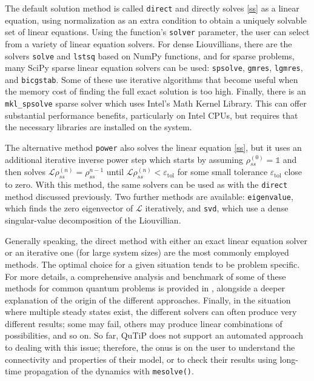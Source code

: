 \documentclass[preprint,3p,sort&compress]{elsarticle}
\def\code#1{\texttt{#1}}
\begin{document}
The default solution method is called \code{direct} and directly solves \eqref{ss} as a linear equation, using normalization as an extra condition %
    to obtain a uniquely solvable set of linear equations.
Using the function's \code{solver} parameter, the user can select from a variety of linear equation solvers. For dense Liouvillians, there are the solvers \code{solve} and \code{lstsq} based on NumPy functions, and for sparse problems, many SciPy sparse linear equation solvers can be used: \code{spsolve}, \code{gmres}, \code{lgmres}, and \code{bicgstab}.  Some of these use iterative algorithms that become useful when the memory cost of finding the full exact solution is too high.  Finally, there is an \code{mkl\_spsolve} sparse solver which uses Intel's Math Kernel Library. This can offer substantial performance benefits, particularly on Intel CPUs, but requires that the necessary libraries are installed on the system.

The alternative method \code{power} also solves the linear equation \eqref{ss}, but it uses an additional iterative inverse power step \cite{nation2015steadystate} which starts by assuming $\rho^{(0)}_{ss} = \mathbb{1}$ and then solves $\mathcal L \rho^{(n)}_{ss} = \rho^{n-1}_{ss}$ until $\mathcal L\rho^{(n)}_{ss} < \varepsilon_{\mathrm{tol}}$ for some small tolerance $\varepsilon_{\mathrm{tol}}$ close to zero. With this method, the same solvers can be used as with the \code{direct} method discussed previously. Two further methods are available: \code{eigenvalue}, which finds the zero eigenvector of $\mathcal{L}$ iteratively, and \code{svd}, which use a dense singular-value decomposition of the Liouvillian.

Generally speaking, the direct method with either an exact linear equation solver or an iterative one (for large system sizes) are the most commonly employed methods. The optimal choice for a given situation tends to be problem specific. For more details, a comprehensive analysis and benchmark of some of these methods for common quantum problems is provided in \cite{nation2015steadystate}, alongside a deeper explanation of the origin of the different approaches.  Finally, in the situation where multiple steady states exist, the different solvers can often produce very different results; some may fail, others may produce linear combinations of possibilities, and so on. So far, QuTiP does not support an automated approach to dealing with this issue; therefore, the onus is on the user to understand the connectivity and properties of their model, or to check their results using long-time propagation of the dynamics with \code{mesolve()}.
\end{document}
